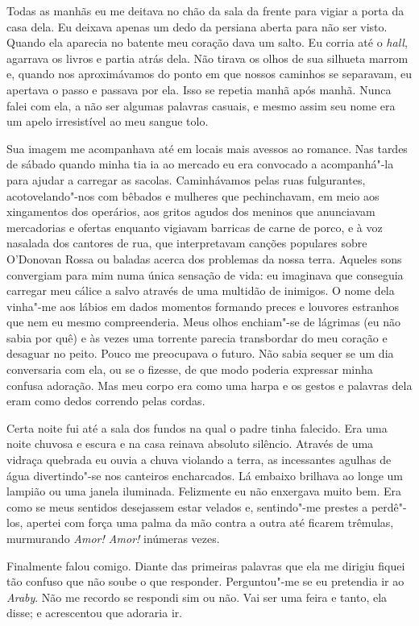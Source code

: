 Todas as manhãs eu me deitava no chão da sala da frente para vigiar a porta da
casa dela.  Eu deixava apenas um dedo da persiana aberta para não ser visto.
Quando ela aparecia no batente meu coração dava um salto.  Eu corria até o
\textit{hall}, agarrava os livros e partia atrás dela.  Não tirava os olhos de
sua silhueta marrom e, quando nos aproximávamos do ponto em que nossos caminhos
se separavam, eu apertava o passo e passava por ela.  Isso se repetia manhã
após manhã.  Nunca falei com ela, a não ser algumas palavras casuais, e mesmo
assim seu nome era um apelo irresistível ao meu sangue tolo.

Sua imagem me acompanhava até em locais mais avessos ao romance.  Nas tardes de
sábado quando minha tia ia ao mercado eu era convocado a acompanhá"-la para
ajudar a carregar as sacolas.  Caminhávamos pelas ruas fulgurantes,
acotovelando"-nos com bêbados e mulheres que pechinchavam, em meio aos
xingamentos dos operários, aos gritos agudos dos meninos que anunciavam
mercadorias e ofertas enquanto vigiavam barricas de carne de porco, e à voz
nasalada dos cantores de rua, que interpretavam canções populares sobre
O’Donovan Rossa ou baladas acerca dos problemas da nossa terra.  Aqueles sons
convergiam para mim numa única sensação de vida: eu imaginava que conseguia
carregar meu cálice a salvo através de uma multidão de inimigos.  O nome dela
vinha"-me aos lábios em dados momentos formando preces e louvores estranhos que
nem eu mesmo compreenderia.  Meus olhos enchiam"-se de lágrimas (eu não sabia por
quê) e às vezes uma torrente parecia transbordar do meu coração e desaguar no
peito.  Pouco me preocupava o futuro.  Não sabia sequer se um dia conversaria
com ela, ou se o fizesse, de que modo poderia expressar minha confusa adoração.
Mas meu corpo era como uma harpa e os gestos e palavras dela eram como dedos
correndo pelas cordas.

Certa noite fui até a sala dos fundos na qual o padre tinha falecido.  Era uma
noite chuvosa e escura e na casa reinava absoluto silêncio.  Através de uma
vidraça quebrada eu ouvia a chuva violando a terra, as incessantes agulhas de
água divertindo"-se nos canteiros encharcados.  Lá embaixo brilhava ao longe um
lampião ou uma janela iluminada.  Felizmente eu não enxergava muito bem.  Era
como se meus sentidos desejassem estar velados e, sentindo"-me prestes a
perdê"-los, apertei com força uma palma da mão contra a outra até ficarem
trêmulas, murmurando \textit{Amor!  Amor!} inúmeras vezes.

Finalmente falou comigo.  Diante das primeiras palavras que ela me dirigiu
fiquei tão confuso que não soube o que responder.  Perguntou"-me se eu pretendia
ir ao \textit{Araby}.  Não me recordo se respondi sim ou não.  Vai ser uma
feira e tanto, ela disse; e acrescentou que adoraria ir.

